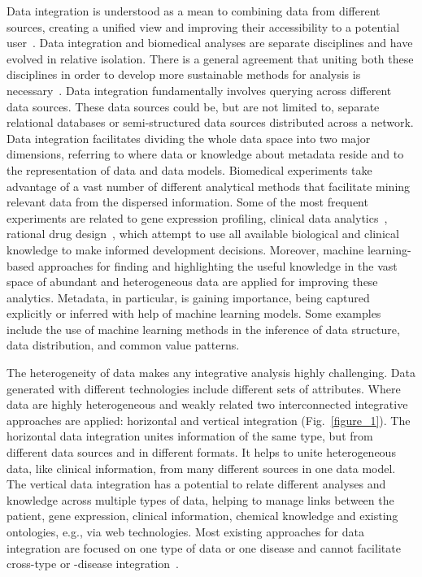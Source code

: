 \documentclass{bmcart}
\begin{document}
Data integration is understood as a mean to combining data from
different sources, creating a unified view and improving their
accessibility to a potential user~\cite{1,2,3}. Data integration and
biomedical analyses are separate disciplines and have evolved in
relative isolation. There is a general agreement that uniting both
these disciplines in order to develop more sustainable methods for
analysis is necessary~\cite{23,24}. Data integration fundamentally involves
querying across different data sources. These data sources could be,
but are not limited to, separate relational databases or
semi-structured data sources distributed across a network. Data
integration facilitates dividing the whole data space into two major
dimensions, referring to where data or knowledge about metadata reside
and to the representation of data and data models. Biomedical
experiments take advantage of a vast number of different analytical
methods that facilitate mining relevant data from the dispersed
information. Some of the most frequent experiments are related to gene
expression profiling, clinical data analytics~\cite{27}, rational drug
design~\cite{25, 26}, which attempt to use all available biological and
clinical knowledge to make informed development decisions. Moreover,
machine learning-based approaches for finding and highlighting the
useful knowledge in the vast space of abundant and heterogeneous data
are applied for improving these analytics. Metadata, in particular, is
gaining importance, being captured explicitly or inferred with help of
machine learning models. Some examples include the use of machine
learning methods in the inference of data structure, data distribution,
and common value patterns.

The heterogeneity of data makes any integrative analysis highly
challenging. Data generated with different technologies include
different sets of attributes. Where data are highly heterogeneous and
weakly related two interconnected integrative approaches are applied:
horizontal and vertical integration (Fig.~\ref{figure_1}). The horizontal data
integration unites information of the same type, but from different
data sources and in different formats. It helps to unite heterogeneous
data, like clinical information, from many different sources in one
data model. The vertical data integration has a potential to relate
different analyses and knowledge across multiple types of data, helping
to manage links between the patient, gene expression, clinical
information, chemical knowledge and existing ontologies, e.g., via web
technologies. Most existing approaches for data integration are focused
on one type of data or one disease and cannot facilitate cross-type or
-disease integration~\cite{28,29}.
\end{document}
